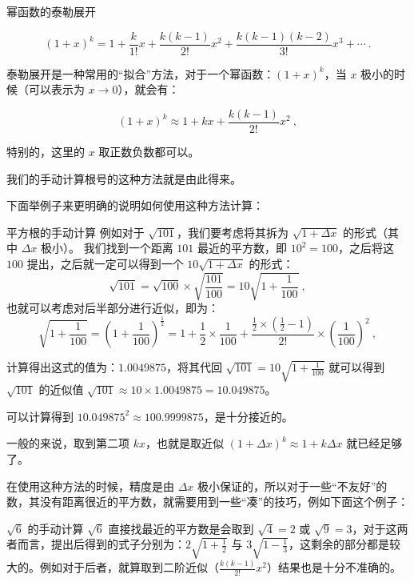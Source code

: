 

\begin{theorem}{幂函数的泰勒展开}

$$(1+x)^k =  1 + \frac{k}{1!} x + \frac{k(k-1)}{2!} x^2 + \frac{k(k-1)(k-2)}{3!} x^3 + \cdots~.$$

\end{theorem}

泰勒展开是一种常用的“拟合”方法，对于一个幂函数：$\left(1+x\right) ^k$，当 $x$ 极小的时候（可以表示为 $x \rightarrow 0$），就会有：

$$(1+x)^k \approx 1 + kx + \frac{k(k-1)}{2!}x^2 ~,$$

特别的，这里的 $x$ 取正数负数都可以。

我们的手动计算根号的这种方法就是由此得来。

下面举例子来更明确的说明如何使用这种方法计算：
\begin{example}{平方根的手动计算}
例如对于 $\sqrt{101}$，我们要考虑将其拆为 $\sqrt{1+ \Delta x}$ 的形式（其中 $\Delta x$ 极小）。
我们找到一个距离 $101$ 最近的平方数，即 $10^2 = 100$，之后将这 $100$ 提出，之后就一定可以得到一个 $10 \sqrt{1 + \Delta x}$ 的形式：
$$\sqrt{101} = \sqrt{100} \times \sqrt{\frac{101}{100}}  = 10 \sqrt{1+\frac{1}{100}}~,$$
也就可以考虑对后半部分进行近似，即为：
$$\sqrt{1 + \frac 1{100}} = \left(1 + \frac 1{100}\right)^{\frac 1 2} = 1 + \frac 12 \times \frac 1{100} + \frac{\frac 12 \times (\frac 12 - 1)}{2!} \times \left(\frac 1{100}\right)^2~,$$

计算得出这式的值为：$1.0049875$，将其代回 $\sqrt{101} = 10 \sqrt{1+\frac{1}{100}}$ 就可以得到 $\sqrt{101}$ 的近似值 $\sqrt{101} \approx 10 \times 1.0049875 = 10.049875$。

可以计算得到 $10.049875^2 \approx 100.9999875$，是十分接近的。
\end{example}

一般的来说，取到第二项 $kx$，也就是取近似 $\left(1+\Delta x\right)^k \approx 1 + k \Delta x $ 就已经足够了。

在使用这种方法的时候，精度是由 $\Delta x$ 极小保证的，所以对于一些“不友好”的数，其没有距离很近的平方数，就需要用到一些“凑”的技巧，例如下面这个例子：
\begin{example}{$\sqrt{6}$ 的手动计算}
$\sqrt{6}$ 直接找最近的平方数是会取到 $\sqrt{4}=2$ 或 $\sqrt{9}=3$，对于这两者而言，提出后得到的式子分别为：$2\sqrt{1 + \frac 12}$ 与 $3 \sqrt{1 - \frac 13}$，这剩余的部分都是较大的。例如对于后者，就算取到二阶近似（$\frac{k(k-1)}{2!} x^2$）结果也是十分不准确的。
\end{example}